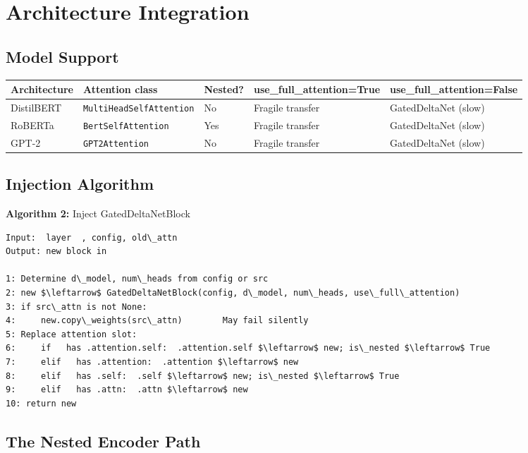 
\section{Architecture Integration}

\subsection{Model Support}

\begin{table}[H]
\centering
\small
\begin{tabular}{lllll}
\toprule
\textbf{Architecture} & \textbf{Attention class} & \textbf{Nested?} & \textbf{use\_full\_attention=True} & \textbf{use\_full\_attention=False} \\
\midrule
DistilBERT & \texttt{MultiHeadSelfAttention} & No & Fragile transfer & GatedDeltaNet (slow) \\
RoBERTa & \texttt{BertSelfAttention} & Yes & Fragile transfer & GatedDeltaNet (slow) \\
GPT-2 & \texttt{GPT2Attention} & No & Fragile transfer & GatedDeltaNet (slow) \\
\bottomrule
\end{tabular}
\end{table}

\subsection{Injection Algorithm}

\textbf{Algorithm 2:} Inject GatedDeltaNetBlock
\begin{lstlisting}
Input:  layer  , config, old\_attn
Output: new block in  

1: Determine d\_model, num\_heads from config or src
2: new $\leftarrow$ GatedDeltaNetBlock(config, d\_model, num\_heads, use\_full\_attention)
3: if src\_attn is not None:
4:     new.copy\_weights(src\_attn)        May fail silently
5: Replace attention slot:
6:     if   has .attention.self:  .attention.self $\leftarrow$ new; is\_nested $\leftarrow$ True
7:     elif   has .attention:  .attention $\leftarrow$ new
8:     elif   has .self:  .self $\leftarrow$ new; is\_nested $\leftarrow$ True
9:     elif   has .attn:  .attn $\leftarrow$ new
10: return new
\end{lstlisting}

\subsection{The Nested Encoder Path}

